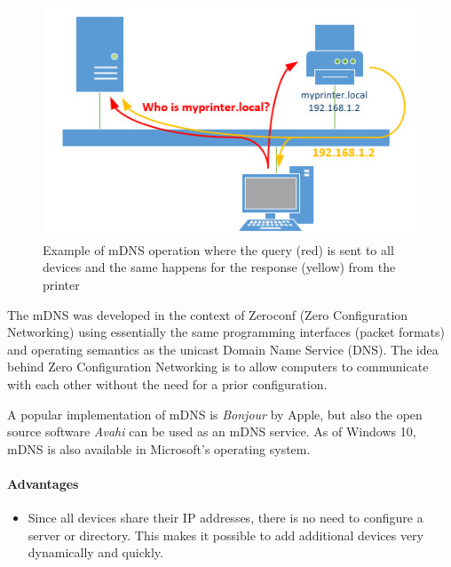 \documentclass[fleqn, 11pt]{SelfArx} %
\begin{document}
\begin{figure}[H]\centering
    \includegraphics[width=\linewidth]{./mdns-02.jpg}
    \caption{Example of mDNS operation where the query (red) is sent to all devices and the same happens for the response (yellow) from the printer}
    \label{fig:msdns-1}
\end{figure}

The mDNS was developed in the context of Zeroconf (Zero Configuration Networking) using essentially the same programming interfaces (packet formats) and operating semantics as the unicast Domain Name Service (DNS). The idea behind Zero Configuration Networking is to allow computers to communicate with each other without the need for a prior configuration.\newline

A popular implementation of mDNS is \textit{Bonjour} by Apple, but also the open source software \textit{Avahi} can be used as an mDNS service. As of Windows 10, mDNS is also available in Microsoft's operating system.

\paragraph{Advantages} 
\begin{itemize}[leftmargin=*]
    \item Since all devices share their IP addresses, there is no need to configure a server or directory. This makes it possible to add additional devices very dynamically and quickly.
\end{itemize}
\end{document}
